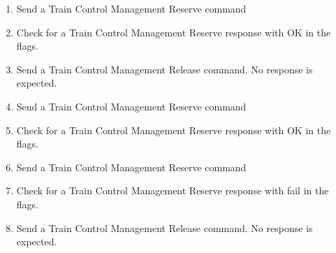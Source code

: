 \begin{enumerate}

    \item Send a Train Control Management Reserve command
    \item Check for a Train Control Management Reserve response with OK in the flags.

    \item Send a Train Control Management Release command.  No response is expected.

    \item Send a Train Control Management Reserve command
    \item Check for a Train Control Management Reserve response with OK in the flags.

    \item Send a Train Control Management Reserve command
    \item Check for a Train Control Management Reserve response with fail in the flags.
    
    \item Send a Train Control Management Release command.  No response is expected.

\end{enumerate}

  
